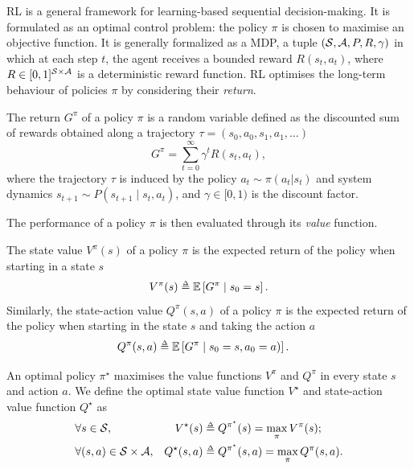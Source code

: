 \ac{RL} is a general framework for learning-based sequential decision-making. It is formulated as an optimal control problem: the policy $\pi$ is chosen to maximise an objective function. It is generally formalized as a \ac{MDP}, \ie a tuple $(\mathcal{S}, \mathcal{A}, P, R, \gamma)$ in which at each step $t$, the agent receives a bounded reward $R(s_t, a_t)$, where $R\in[0, 1]^{\mathcal{S}\times\mathcal{A}}$ is a deterministic reward function. RL optimises the long-term behaviour of policies $\pi$ by considering their \emph{return}.

\begin{definition}[Return]
	The {return} $G^\pi$ of a policy $\pi$ is a random variable defined as the discounted sum of rewards obtained along a trajectory $\tau = (s_0, a_0, s_1, a_1, \dots)$
	\begin{equation*}
	G^\pi = \sum_{t=0}^\infty \gamma^t R(s_t, a_t),
	\end{equation*}
	where the trajectory $\tau$ is induced by the policy $a_t\sim \pi(a_t|s_t)$ and system dynamics $s_{t+1}\sim P(s_{t+1} \mid s_t, a_t)$,  and $\gamma\in[0,1)$ is the discount factor.
\end{definition}

The performance of a policy $\pi$ is then evaluated through its \emph{value} function. 
\begin{definition}
	The state value $V^\pi(s)$ of a policy $\pi$ is the expected return of the policy when starting in a state $s$
	\begin{align*}
	V^\pi(s) \eqdef \expectedvalue\left[ G^\pi \mid s_0=s\right].
	\end{align*}
	Similarly, the state-action value $Q^\pi(s, a)$ of a policy $\pi$ is the expected return of the policy when starting in the state $s$ and taking the action $a$
	\begin{align*}
	Q^\pi(s, a) &\eqdef \expectedvalue\left[ G^\pi \mid s_0=s, a_0 = a)\right].
	\end{align*}
\end{definition}

\begin{definition}[Optimality]
An optimal policy $\pi^\star$ maximises the value functions $V^\pi$ and $Q^\pi$ in every state $s$ and action $a$. We define the optimal state value function $V^\star$ and state-action value function $Q^\star$ as 
\begin{align*}
&\forall s\in \cS, & V^\star(s) &\eqdef Q^{\pi^\star}(s) = \max_\pi V^\pi(s);\\
&\forall (s,a)\in \cS\times\cA,& Q^\star(s, a) &\eqdef Q^{\pi^\star}(s, a) = \max_\pi Q^\pi(s, a).
\end{align*}
\end{definition}

